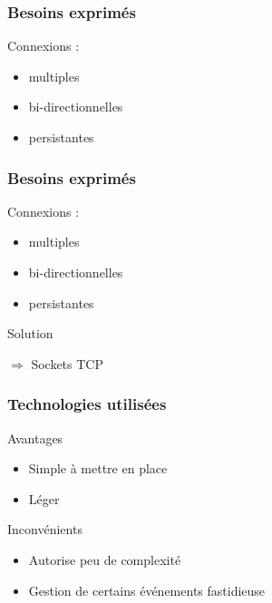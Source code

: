 \begin{frame}
	\frametitle{Besoins exprimés}
		Connexions :
		\vspace{0.5cm}
		\begin{itemize}
			\item multiples
			\item bi-directionnelles
			\item persistantes
		\end{itemize}
\end{frame}

\begin{frame}
	\frametitle{Besoins exprimés}
		Connexions :
		\vspace{0.5cm}
		\begin{itemize}
			\item multiples
			\item bi-directionnelles
			\item persistantes
		\end{itemize}
		\begin{block}{Solution}
			\begin{center}
				$\Rightarrow$ Sockets TCP
			\end{center}
		\end{block}
\end{frame}


\begin{frame}
	\frametitle{Technologies utilisées}
	\begin{block}{Avantages}
		\begin{itemize}
			\item Simple à mettre en place
			\item Léger
		\end{itemize}
	\end{block}
	\begin{block}{Inconvénients}
		\begin{itemize}
			\item Autorise peu de complexité
			\item Gestion de certains événements fastidieuse
		\end{itemize}
	\end{block}
\end{frame}